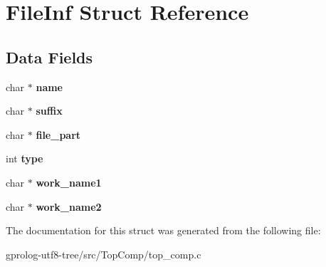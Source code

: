 \hypertarget{structFileInf}{}\section{File\+Inf Struct Reference}
\label{structFileInf}
\subsection*{Data Fields}
\begin{DoxyCompactItemize}
\item 
char $\ast$ {\bfseries name}\hypertarget{structFileInf_a4dc1b0d5b390f714210d47b147af9e9b}{}\label{structFileInf_a4dc1b0d5b390f714210d47b147af9e9b}

\item 
char $\ast$ {\bfseries suffix}\hypertarget{structFileInf_a5ef754a773b84e5a9917436c6d8afe72}{}\label{structFileInf_a5ef754a773b84e5a9917436c6d8afe72}

\item 
char $\ast$ {\bfseries file\+\_\+part}\hypertarget{structFileInf_acb68ba4e07ba186e94a267560253b2bb}{}\label{structFileInf_acb68ba4e07ba186e94a267560253b2bb}

\item 
int {\bfseries type}\hypertarget{structFileInf_a08c8fec214c452fa67b03a36ac58db5f}{}\label{structFileInf_a08c8fec214c452fa67b03a36ac58db5f}

\item 
char $\ast$ {\bfseries work\+\_\+name1}\hypertarget{structFileInf_aab7c6e078d6f1ae349cf70872f35531d}{}\label{structFileInf_aab7c6e078d6f1ae349cf70872f35531d}

\item 
char $\ast$ {\bfseries work\+\_\+name2}\hypertarget{structFileInf_a73706e94bc2b8654cfba501d8fce856e}{}\label{structFileInf_a73706e94bc2b8654cfba501d8fce856e}

\end{DoxyCompactItemize}


The documentation for this struct was generated from the following file\+:\begin{DoxyCompactItemize}
\item 
gprolog-\/utf8-\/tree/src/\+Top\+Comp/top\+\_\+comp.\+c\end{DoxyCompactItemize}
